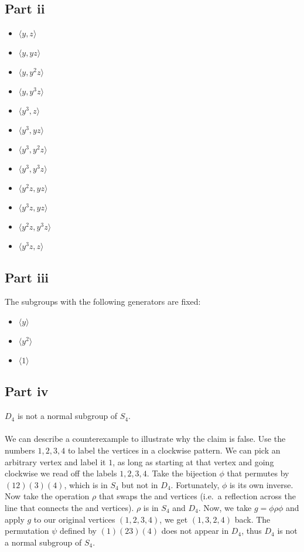 \documentclass[letterpaper]{article}
\begin{document}
\subsection{Part ii}
\label{subsec:6Partii}

\begin{itemize}
    \item $ \langle y, z \rangle $
    \item $ \langle y, yz \rangle $
    \item $ \langle y, y^2z \rangle $
    \item $ \langle y, y^3z \rangle $

    \item $ \langle y^3, z \rangle $
    \item $ \langle y^3, yz \rangle $
    \item $ \langle y^3, y^2z \rangle $
    \item $ \langle y^3, y^3z \rangle $

    \item $ \langle y^2z, yz \rangle $
    \item $ \langle y^3z, yz \rangle $
    \item $ \langle y^2z, y^3z \rangle $
    \item $ \langle y^3z, z \rangle $
\end{itemize}

\subsection{Part iii}
\label{subsec:6Partiii}

The subgroups with the following generators are fixed:
\begin{itemize}
    \item $ \langle y \rangle $
    \item $ \langle y^2 \rangle $
    \item $ \langle 1 \rangle $
\end{itemize}

\subsection{Part iv}
\label{subsec:6Partiv}
$ D_4 $ is not a normal subgroup of $ S_4 $.
\\ \\
We can describe a counterexample to illustrate why the claim is false.
Use the numbers $ 1, 2, 3, 4 $ to label the vertices in a clockwise pattern.
We can pick an arbitrary vertex and label it $ 1 $, as long as starting at that vertex and going clockwise we read off the labels $ 1, 2, 3, 4 $.
Take the bijection $ \phi $ that permutes by $ (12)(3)(4) $, which is in $ S_4 $ but not in $ D_4 $.
Fortunately, $ \phi $ is its own inverse.
Now take the operation $ \rho $ that swaps the  and  vertices (i.e.\ a reflection across the line that connects the  and  vertices).
$ \rho $ is in $ S_4 $ and $ D_4 $.
Now, we take $ g = \phi \rho \phi $ and apply $ g $ to our original vertices $ (1, 2, 3, 4) $, we get $ (1, 3, 2, 4) $ back.
The permutation $ \psi $ defined by $ (1)(23)(4) $ does not appear in $ D_4 $, thus $ D_4 $ is not a normal subgroup of $ S_4 $.
\end{document}
